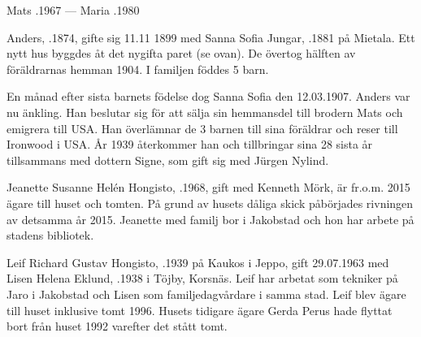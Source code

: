 Mats .1967  ---  Maria .1980


Anders, .1874, gifte sig 11.11 1899 med Sanna Sofia Jungar, .1881 på Mietala. Ett nytt hus byggdes åt det nygifta paret (se ovan). De övertog hälften av föräldrarnas  hemman 1904. I familjen föddes 5 barn.
\begin{jhchildren}
  \item {}
  \item {}
  \item {}
  \item {}
  \item {}
\end{jhchildren}

En månad efter sista barnets födelse dog Sanna Sofia den 12.03.1907. Anders var nu änkling. Han beslutar sig för att sälja sin hemmansdel till brodern Mats och emigrera till USA. Han överlämnar de 3 barnen till sina föräldrar och reser till Ironwood i USA. År 1939 återkommer han och tillbringar sina 28 sista år tillsammans med dottern Signe, som gift sig med Jürgen Nylind.





Jeanette Susanne Helén Hongisto, .1968, gift med Kenneth Mörk, är fr.o.m. 2015 ägare till huset och tomten. På grund av husets dåliga skick påbörjades rivningen av detsamma år 2015. Jeanette med familj bor i Jakobstad och hon har arbete på stadens bibliotek.


Leif Richard Gustav Hongisto, .1939 på Kaukos i Jeppo, gift 29.07.1963 med Lisen Helena Eklund, .1938 i Töjby, Korsnäs. Leif har arbetat som tekniker på Jaro i Jakobstad och Lisen som familjedagvårdare i samma stad. Leif blev ägare till  huset inklusive tomt 1996. Husets tidigare ägare Gerda Perus hade flyttat bort från huset 1992 varefter det stått tomt.

